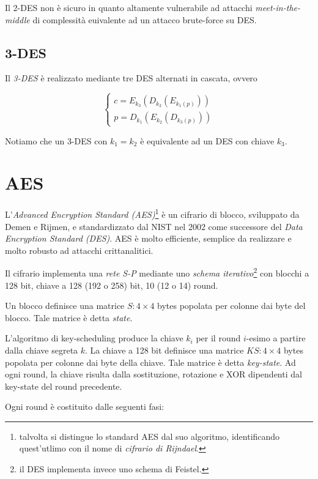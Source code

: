 Il 2-DES non è sicuro in quanto altamente vulnerabile ad attacchi \textit{meet-in-the-middle} di complessità euivalente ad un attacco brute-force su DES.

\subsection{3-DES}
Il \textit{3-DES} è realizzato mediante tre DES alternati in cascata, ovvero

\begin{equation}
\begin{cases}
  c=E_{k_{3}}(D_{k_{2}}(E_{k_{1}(p)}))\\
  p=D_{k_{1}}(E_{k_{2}}(D_{k_{3}(p)}))
\end{cases}
\end{equation}

Notiamo che un 3-DES con $k_{1}=k_{2}$ è equivalente ad un DES con chiave $k_{3}$.

\section{AES}
L'\textit{Advanced Encryption Standard (AES)}\footnote{talvolta si distingue lo standard AES dal suo algoritmo, identificando quest'utlimo con il nome di \textit{cifrario di Rijndael}.} è un cifrario di blocco, sviluppato da Demen e Rijmen, e standardizzato dal NIST nel 2002 come successore del \textit{Data Encryption Standard (DES)}. AES è molto efficiente, semplice da realizzare e molto robusto ad attacchi crittanalitici.

Il cifrario implementa una \textit{rete S-P} mediante uno \textit{schema iterativo}\footnote{il DES implementa invece uno schema di Feistel.} con blocchi a 128 bit, chiave a 128 (192 o 258) bit, 10 (12 o 14) round.

Un blocco definisce una matrice $S:4 \times 4$ bytes popolata per colonne dai byte del blocco. Tale matrice è detta \textit{state}.

L'algoritmo di key-scheduling produce la chiave $k_{i}$ per il round $i$-esimo a partire dalla chiave segreta $k$.
La chiave a 128 bit definisce una matrice $KS:4 \times 4$ bytes popolata per colonne dai byte della chiave. Tale matrice è detta \textit{key-state}. Ad ogni round, la chiave risulta dalla sostituzione, rotazione e XOR dipendenti dal key-state del round precedente.

Ogni round è costituito dalle seguenti fasi:

